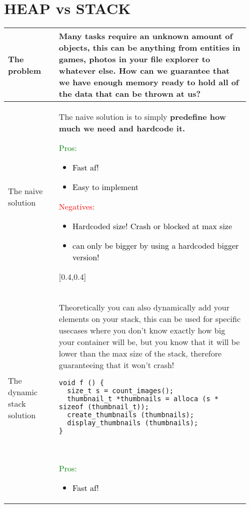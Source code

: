 \documentclass[main.tex,fontsize=8pt,paper=a4,paper=portrait,DIV=calc,]{scrartcl}
\begin{document}
\begin{table}[ht!]
\section{HEAP vs STACK}
\begin{tabular}{|m{0.2\linewidth}|m{0.755\linewidth}|}
\hline
The problem & 
Many tasks require an \textbf{unknown amount of objects}, this can be anything from entities in games, photos in your file explorer to whatever else.\newline
How can we guarantee that we have enough memory ready to hold all of the data that can be thrown at us?\\
\hline
The naive solution & 
The naive solution is to simply \textbf{predefine how much we need and hardcode it.}\newline
\minipg{
\textcolor{green}{Pros:}\newline
\begin{itemize}
\item \textcolor{black}{Fast af!}
\item \textcolor{black}{Easy to implement}
\end{itemize} 
}{ 
\textcolor{red}{Negatives:}\newline
\begin{itemize}
\item \textcolor{black}{Hardcoded size! Crash or blocked at max size}
\item \textcolor{black}{can only be bigger by using a hardcoded bigger version!}
\end{itemize} 
}[0.4,0.4]\\
\hline
The dynamic stack solution & 
Theoretically you can also dynamically add your elements on your stack, this can be used for specific usecases where you don't know exactly how big your container will be, but you know that it will be lower than the max size of the stack, therefore guaranteeing that it won't crash!\newline
\begin{lstlisting}
void f () {
  size_t s = count_images();
  thumbnail_t *thumbnails = alloca (s * sizeof (thumbnail_t));
  create_thumbnails (thumbnails);
  display_thumbnails (thumbnails);
}
\end{lstlisting}
\, \newline
\minipg{
\textcolor{green}{Pros:}\newline
\begin{itemize}
\item \textcolor{black}{Fast af!}

\end{itemize}}
\end{tabular}
\end{table}
\end{document}
